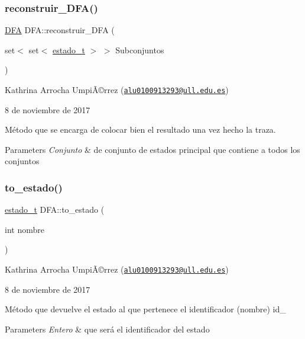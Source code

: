 \subsubsection{\texorpdfstring{reconstruir\+\_\+\+D\+F\+A()}{reconstruir\_DFA()}}
{\footnotesize\ttfamily \hyperlink{class_d_f_a}{D\+FA} D\+F\+A\+::reconstruir\+\_\+\+D\+FA (\begin{DoxyParamCaption}\item[{set$<$ set$<$ \hyperlink{classestado__t}{estado\+\_\+t} $>$ $>$}]{Subconjuntos }\end{DoxyParamCaption})}

Kathrina Arrocha UmpiÃ©rrez (\href{mailto:alu0100913293@ull.edu.es}{\tt alu0100913293@ull.\+edu.\+es})

8 de noviembre de 2017

Método que se encarga de colocar bien el resultado una vez hecho la traza.


\begin{DoxyParams}{Parameters}
{\em Conjunto} & de conjunto de estados principal que contiene a todos los conjuntos \\
\hline
\end{DoxyParams}
\mbox{\label{class_d_f_a_ad92a42b4d642834add9a14f85b3c1aa7}} 
\subsubsection{\texorpdfstring{to\+\_\+estado()}{to\_estado()}}
{\footnotesize\ttfamily \hyperlink{classestado__t}{estado\+\_\+t} D\+F\+A\+::to\+\_\+estado (\begin{DoxyParamCaption}\item[{int}]{nombre }\end{DoxyParamCaption})}

Kathrina Arrocha UmpiÃ©rrez (\href{mailto:alu0100913293@ull.edu.es}{\tt alu0100913293@ull.\+edu.\+es})

8 de noviembre de 2017

Método que devuelve el estado al que pertenece el identificador (nombre) id\+\_\+ 
\begin{DoxyParams}{Parameters}
{\em Entero} & que será el identificador del estado \\
\hline
\end{DoxyParams}
\mbox{\label{class_d_f_a_a58c2890860965eb2c1dc337f667f92e5}} 
